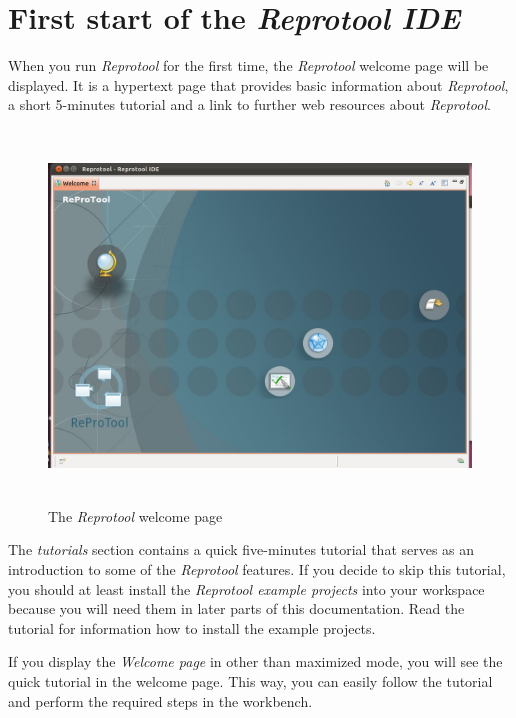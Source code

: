 \section{First start of the \emph{Reprotool IDE}}
When you run \emph{Reprotool} for the first time, the \emph{Reprotool} welcome page will be displayed. It is a hypertext page that
provides basic information about \emph{Reprotool}, a short 5-minutes tutorial and a link to further web resources about \emph{Reprotool}.

\begin{figure}[ht]
  \centering
  \includegraphics[height=280pt]{images/reprotoolWelcome}
  \caption{The \emph{Reprotool} welcome page}
  \label{fig:reprotoolWelcome}
\end{figure}

The \emph{tutorials} section contains a quick five-minutes tutorial that serves as an introduction to some of the \emph{Reprotool}
features. If you decide to skip this tutorial, you should at least install the \emph{Reprotool example projects} into your workspace
because you will need them in later parts of this documentation. Read the tutorial for information how to install the example projects.

If you display the \emph{Welcome page} in other than maximized mode, you will see the quick tutorial in the welcome page. This way, you
can easily follow the tutorial and perform the required steps in the workbench.

\newpage

